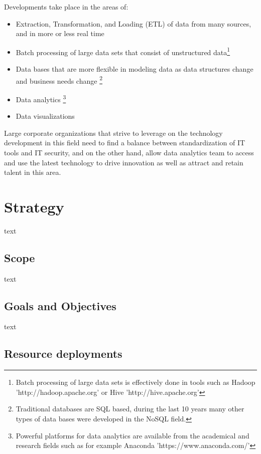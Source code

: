 \documentclass[10pt]{article} %
\begin{document}
Developments take place in the areas of:
\begin{itemize}
				\item Extraction, Transformation, and Loading (ETL) of data from many sources, and in more or less real time
				\item Batch processing of large data sets that consist of unstructured data\footnote{Batch processing of large data sets is effectively done in tools such as Hadoop 'http://hadoop.apache.org' or Hive 'http://hive.apache.org'}
				\item Data bases that are more flexible in modeling data as data structures change and business needs change \footnote{Traditional databases are SQL based, during the last 10 years many other types of data bases were developed in the NoSQL field.}
				\item Data analytics \footnote{Powerful platforms for data analytics are available from the academical and research fields such as for example Anaconda 'https://www.anaconda.com/'}
				\item Data visualizations
\end{itemize}

Large corporate organizations that strive to leverage on the technology development in this field need to find a balance between standardization of IT tools and IT security, and on the other hand, allow data analytics team to access and use the latest technology to drive innovation as well as attract and retain talent in this area.

\section{Strategy}
text

\subsection{Scope}

text

\subsection{Goals and Objectives}

text

\subsection{Resource deployments}
\end{document}
